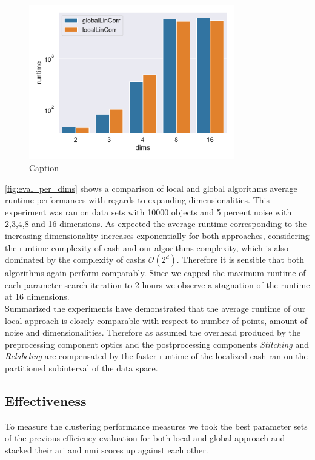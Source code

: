 \begin{figure}[h]
    \centering
        \includegraphics[width=0.8\textwidth]{evaluation/per_dims/Avg_Runtime_O10000_N5_pdims_log.pdf}
    \caption{Caption}
    \label{fig:eval_per_dims}
\end{figure}

\autoref{fig:eval_per_dims} shows a comparison of local and global algorithms average runtime performances with regards to expanding dimensionalities. This experiment was ran on data sets with 10000 objects and 5 percent noise with 2,3,4,8 and 16 dimensions. As expected the average runtime corresponding to the increasing dimensionality increases exponentially for both approaches, considering the runtime complexity of \gls{cash} and our algorithms complexity, which is also dominated by the complexity of \gls{cash}s $\mathcal{O}(2^d)$. Therefore it is sensible that both algorithms again perform comparably.
Since we capped the maximum runtime of each parameter search iteration to 2 hours we observe a stagnation of the runtime at 16 dimensions.\\

Summarized the experiments have demonstrated that the average runtime of our local approach is closely comparable with respect to number of points, amount of noise and dimensionalities. Therefore as assumed the overhead produced by the preprocessing component \gls{optics} and the postprocessing components \textit{Stitching} and \textit{Relabeling} are compensated by the faster runtime of the localized \gls{cash} ran on the partitioned subinterval of the data space. 
 
\subsection{Effectiveness}
To measure the clustering performance measures we took the best parameter sets of the previous efficiency evaluation for both local and global approach and stacked their \gls{ari} and \gls{nmi} scores up against each other. 

